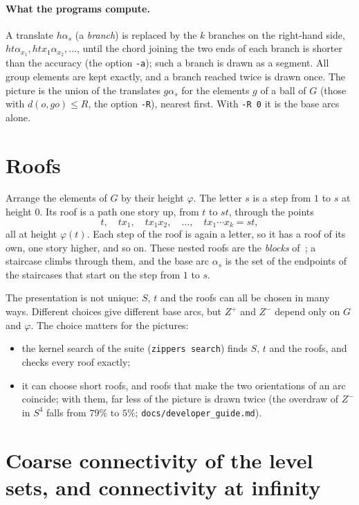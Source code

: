 \documentclass[11pt]{article}
\theoremstyle{remark}
\begin{document}
\paragraph{What the programs compute.} A translate $h\alpha_s$ (a \emph{branch}) is replaced by the $k$ branches on the
right-hand side, $ht\alpha_{x_1}, htx_1\alpha_{x_2},\dots$, until the chord joining the two ends of each branch is shorter
than the accuracy (the option \texttt{-a}); such a branch is drawn as a segment. All group elements are kept exactly, and
a branch reached twice is drawn once. The picture is the union of the translates $g\alpha_s$ for the elements $g$ of a
ball of $G$ (those with $d(o,go)\le R$, the option \texttt{-R}), nearest first. With \texttt{-R 0} it is the base arcs
alone.

\section{Roofs}

Arrange the elements of $G$ by their height $\varphi$. The letter $s$ is a step from $1$ to $s$ at height $0$. Its roof
is a path one story up, from $t$ to $st$, through the points
\[
t,\quad tx_1,\quad tx_1x_2,\quad\dots,\quad tx_1\cdots x_k=st,
\]
all at height $\varphi(t)$. Each step of the roof is again a letter, so it has a roof of its own, one story higher, and so on.
These nested roofs are the \emph{blocks} of~\cite{CL}; a staircase climbs through them, and the base arc $\alpha_s$ is the set of
the endpoints of the staircases that start on the step from $1$ to $s$.

The presentation is not unique: $S$, $t$ and the roofs can all be chosen in many ways. Different choices give different
base arcs, but $Z^+$ and $Z^-$ depend only on $G$ and $\varphi$. The choice matters for the pictures:
\begin{itemize}
\item the kernel search of the suite (\texttt{zippers search}) finds $S$, $t$ and the roofs, and checks every roof exactly;
\item it can choose short roofs, and roofs that make the two orientations of an arc coincide; with them, far less of the
picture is drawn twice (the overdraw of $Z^-$ in $S^4$ falls from $79\%$ to $5\%$; \texttt{docs/developer\_guide.md}).
\end{itemize}

\section{Coarse connectivity of the level sets, and connectivity at infinity}
\end{document}
